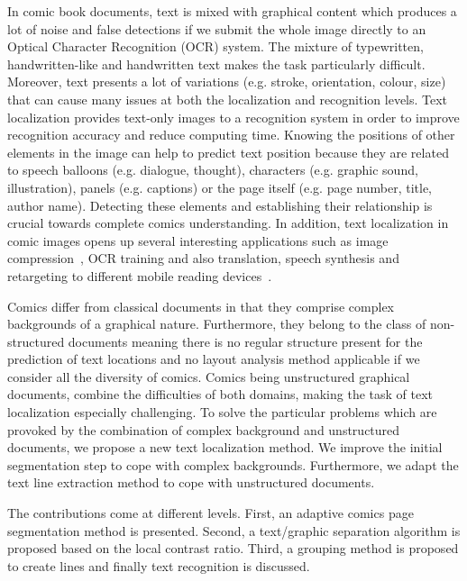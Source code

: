 In comic book documents, text is mixed with graphical content which produces a lot of noise and false detections if we submit the whole image directly to an Optical Character Recognition (OCR) system.
The mixture of typewritten, handwritten-like and handwritten text makes the task particularly difficult.
Moreover, text presents a lot of variations (e.g. stroke, orientation, colour, size) that can cause many issues at both the localization and recognition levels.
Text localization provides text-only images to a recognition system in order to improve recognition accuracy and reduce computing time.
Knowing the positions of other elements in the image can help to predict text position because they are related to speech balloons (e.g. dialogue, thought), characters (e.g. graphic sound, illustration), panels (e.g. captions) or the page itself (e.g. page number, title, author name).
Detecting these elements and establishing their relationship is crucial towards complete comics understanding.
In addition, text localization in comic images opens up several interesting applications such as image compression~\cite{Su11}, OCR training and also translation, speech synthesis and retargeting to different mobile reading devices~\cite{Matsui2011}.

Comics differ from classical documents in that they comprise complex backgrounds of a graphical nature. Furthermore, they belong to the class of non-structured documents meaning there is no regular structure present for the prediction of text locations and no layout analysis method applicable if we consider all the diversity of comics.
Comics being unstructured graphical documents, combine the difficulties of both domains, making the task of text localization especially challenging.
To solve the particular problems which are provoked by the combination of complex background and unstructured documents, we propose a new text localization method.
We improve the initial segmentation step to cope with complex backgrounds.
Furthermore, we adapt the text line extraction method to cope with unstructured documents.





The contributions come at different levels. First, an adaptive comics page segmentation method is presented. Second, a text/graphic separation algorithm is proposed based on the local contrast ratio. Third, a grouping method is proposed to create lines and finally text recognition is discussed.

